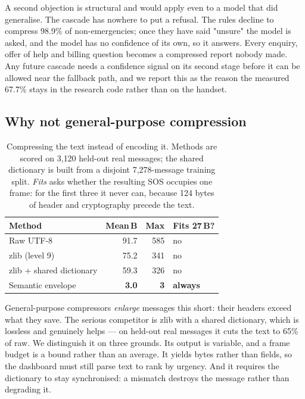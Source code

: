 \documentclass[conference]{IEEEtran}
\begin{document}
A second objection is structural and would apply even to a model that did
generalise. The cascade has nowhere to put a refusal. The rules decline to
compress 98.9\% of non-emergencies; once they have said "unsure" the model
is asked, and the model has no confidence of its own, so it answers. Every
enquiry, offer of help and billing question becomes a compressed report
nobody made. Any future cascade needs a confidence signal on its second
stage before it can be allowed near the fallback path, and we report this
as the reason the measured 67.7\% stays in the research code rather than on
the handset.

\subsection{Why not general-purpose compression}

\begin{table}[htbp]
\caption{Compressing the text instead of encoding it. Methods are scored on
3{,}120 held-out real messages; the shared dictionary is built from a disjoint
7{,}278-message training split. \emph{Fits} asks whether the resulting SOS
occupies one frame: for the first three it never can, because 124 bytes of
header and cryptography precede the text.}
\begin{center}
\begin{tabular}{lrrl}
\toprule
\textbf{Method} & \textbf{Mean\,B} & \textbf{Max} & \textbf{Fits 27\,B?} \\
\midrule
Raw UTF-8                 &  91.7 & 585 & no \\
zlib (level 9)            &  75.2 & 341 & no \\
zlib + shared dictionary  &  59.3 & 326 & no \\
Semantic envelope         & \textbf{3.0} & \textbf{3} & \textbf{always} \\
\bottomrule
\end{tabular}
\label{tab:compress}
\end{center}
\end{table}

General-purpose compressors \emph{enlarge} messages this short: their headers
exceed what they save. The serious competitor is zlib with a shared
dictionary, which is lossless and genuinely helps --- on held-out real
messages it cuts the text to 65\% of raw. We distinguish it on three grounds.
Its output is variable, and a frame budget is a bound rather than an average.
It yields bytes rather than fields, so the dashboard must still parse text to
rank by urgency. And it requires the dictionary to stay synchronised: a
mismatch destroys the message rather than degrading it.
\end{document}
